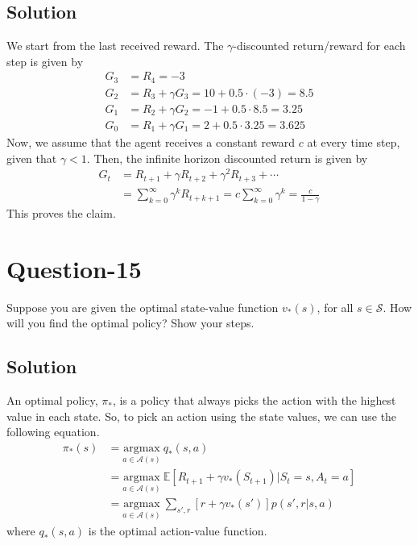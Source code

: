\documentclass[11pt]{article}
\begin{document}
    \subsection*{Solution}
    We start from the last received reward. The $\gamma$-discounted return/reward for each step is given by
    \begin{align*}
        G_{3} &= R_{4} = -3 \\
        G_{2} &= R_{3} + \gamma G_{3} = 10 + 0.5 \cdot (-3) = 8.5 \\
        G_{1} &= R_{2} + \gamma G_{2} = -1 + 0.5 \cdot 8.5 = 3.25 \\
        G_{0} &= R_{1} + \gamma G_{1} = 2 + 0.5 \cdot 3.25 = 3.625
    \end{align*}
    Now, we assume that the agent receives a constant reward $c$ at every time step, given that $\gamma < 1$.
    Then, the infinite horizon discounted return is given by
    \begin{align*}
        G_{t} &= R_{t+1} + \gamma R_{t+2} + \gamma^{2} R_{t+3} + \cdots \\
        &= \sum_{k=0}^{\infty} \gamma^{k} R_{t+k+1} = c \sum_{k=0}^{\infty} \gamma^{k} = \frac{c}{1 - \gamma}
    \end{align*}
    This proves the claim.

    \section*{Question-15}
    Suppose you are given the optimal state-value function $v_{*}(s)$, for all $s \in \mathcal{S}$. How will you
    find the optimal policy? Show your steps.

    \subsection*{Solution}
    An optimal policy, $\pi_{*}$, is a policy that always picks the action with the highest value in each state.
    So, to pick an action using the state values, we can use the following equation.
    \begin{align*}
        \pi_{*}(s) &= \underset{a \in \mathcal{A}(s)}{\mathrm{argmax}} \ q_{*}(s, a) \\
        &= \underset{a \in \mathcal{A}(s)}{\mathrm{argmax}} \ \mathbb{E}[R_{t+1} + \gamma v_{*}(S_{t+1}) | S_{t} = s, A_{t} = a] \\
        &= \underset{a \in \mathcal{A}(s)}{\mathrm{argmax}} \ \sum_{s', r} \left[ r + \gamma v_{*}(s') \right] p(s', r | s, a)
    \end{align*}
    where $q_{*}(s, a)$ is the optimal action-value function.
\end{document}
